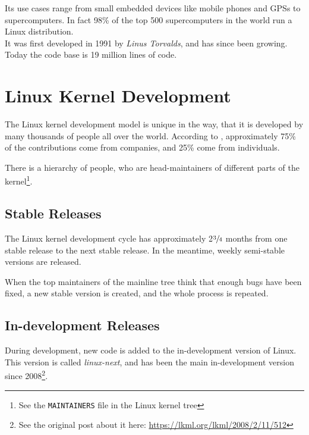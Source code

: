 \documentclass[a4paper,11pt]{report}
\newcommand{\f}{\footnote{\fn}}
\newcommand{\textcode}[1]{\fboxsep=1pt\texttt{\colorbox{gray!20}{#1}}}
\begin{document}
Its use cases range from small embedded devices like mobile phones and GPSs to 
supercomputers. In fact 98\% of the top 500 supercomputers in the world run a 
Linux distribution\cite{top500}. 
\\

It was first developed in 1991 by \emph{Linus Torvalds}, and has since been 
growing. Today the code base is 19 million lines of code.


            \section{Linux Kernel Development}

            \def \fn {See the \textcode{MAINTAINERS} file in  
            the Linux kernel tree}

The Linux kernel development model is unique in the  way, that it is developed 
by many thousands of people all over the world. According to \cite{gkh}, 
approximately 75\% of the contributions come from companies, and 25\% come from 
individuals. 

There is a hierarchy of people, who are head-maintainers of different parts of 
the kernel\f.


            \subsection*{Stable Releases}

The Linux kernel development cycle has approximately 2$\sfrac{3}{4}$ months 
from one stable release to the next stable release\cite
    {crystalball}.
In the meantime, weekly semi-stable versions are released.

When the top maintainers of the mainline tree think that enough bugs have been 
fixed, a new stable version is created, and the whole process is repeated.


            \subsection*{In-development Releases}

            \def \fn {See the original post about it here: 
            \url{https://lkml.org/lkml/2008/2/11/512}}

During development, new code is added to the in-development version of Linux.
This version is called \emph{linux-next}, and has been the main in-development version
since 2008\f.
\\
\end{document}
